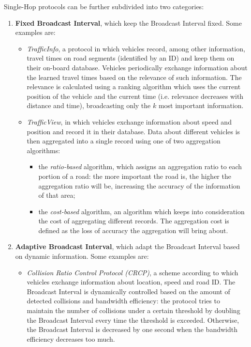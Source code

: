 			Single-Hop protocols can be further subdivided into two categories:
			\begin{enumerate}
				\item \textbf{Fixed Broadcast Interval}, which keep the Broadcast Interval fixed. Some examples are:
				\begin{itemize}
					\renewcommand\labelitemi{--}
					\item \textit{TrafficInfo}\cite{4621303}, a protocol in which vehicles record, among other information, travel times on road segments (identified by an ID) and keep them on their on-board database. Vehicles periodically exchange information about the learned travel times based on the relevance of such information. The relevance is calculated using a ranking algorithm which uses the current position of the vehicle and the current time (i.e. relevance decreases with distance and time), broadcasting only the $k$  most important information. 
					\item \textit{TrafficView}\cite{1263039}, in which vehicles exchange information about speed and position and record it in their database. Data about different vehicles is then aggregated into a single record using one of two aggregation algorithms:
					\begin{itemize}
						\item the \textit{ratio-based} algorithm, which assigns an aggregation ratio to each portion of a road: the more important the road is, the higher the aggregation ratio will be, increasing the accuracy of the information of that area;
						\item the \textit{cost-based} algorithm, an algorithm which keeps into consideration the cost of aggregating different records. The aggregation cost is defined as the loss of accuracy the aggregation will bring about.
					\end{itemize} 
				\end{itemize}
				\item \textbf{Adaptive Broadcast Interval}, which adapt the Broadcast Interval based on dynamic information. Some examples are:
				\begin{itemize}
					\renewcommand\labelitemi{--}
					
					\item \textit{Collision Ratio Control Protocol (CRCP)}\cite{4357748}, a scheme according to which vehicles exchange information about location, speed and road ID. The Broadcast Interval is dynamically controlled based on the amount of detected collisions and bandwidth efficiency: the protocol tries to maintain the number of collisions under a certain threshold by doubling the Broadcast Interval every time the threshold is exceeded. Otherwise, the Broadcast Interval is decreased by one second when the bandwidth efficiency decreases too much.
					

\end{itemize}
\end{enumerate}
